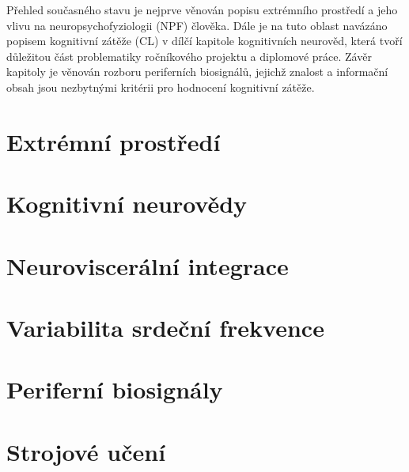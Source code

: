 Přehled současného stavu je nejprve věnován popisu extrémního prostředí a jeho
vlivu na neuropsychofyziologii (\gls{NPF}) člověka. Dále je na tuto oblast
navázáno popisem kognitivní zátěže (\gls{CL}) v dílčí kapitole kognitivních
neurověd, která tvoří důležitou část problematiky ročníkového projektu a
diplomové práce. Závěr kapitoly je věnován rozboru periferních biosignálů,
jejichž znalost a informační obsah jsou nezbytnými kritérii pro hodnocení
kognitivní zátěže.

\section{Extrémní prostředí}
\label{sec:extreme_environment}


\section{Kognitivní neurovědy}
\label{sec:cognitive_neuroscience}


\section{Neuroviscerální integrace}
\label{sec:neurovisceralni_integrace}


\section{Variabilita srdeční frekvence}
\label{sec:hrv}


\section{Periferní biosignály}
\label{sec:peripheral_biosignals}


\section{Strojové učení}
\label{sec:machine_learning}
